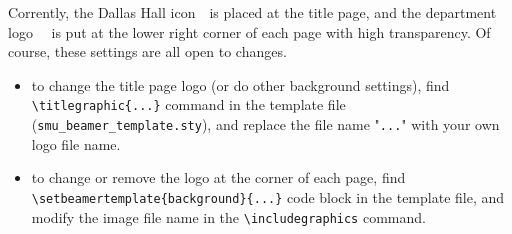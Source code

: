 \documentclass[12pt, aspectratio=169]{beamer}
\begin{document}
\begin{frame}[fragile]{\insertsubsection}
Corrently, the Dallas Hall icon\ \ is placed at the title page, and the department logo \ \ is put at the lower right corner of each page with high transparency. Of course, these settings are all open to changes.
\begin{itemize}
    \item to change the title page logo (or do other background settings), find \verb|\titlegraphic{...}| command in the template file (\verb|smu_beamer_template.sty|), and replace the file name "\verb|...|" with your own logo file name.
    \item to change or remove the logo at the corner of each page, find \verb|\setbeamertemplate{background}{...}| code block in the template file, and modify the image file name in the \verb|\includegraphics| command.
\end{itemize}
\end{frame}
\end{document}
